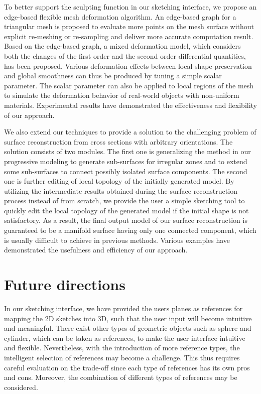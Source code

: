 To better support the sculpting function  in our sketching
interface, we propose an edge-based flexible mesh deformation
algorithm. An edge-based graph for a triangular mesh is proposed to
evaluate more points on the mesh surface without explicit re-meshing
or re-sampling and deliver more accurate computation result. Based
on the edge-based graph, a mixed deformation model, which considers
both the changes of the first order and the second order
differential quantities, has been proposed. Various deformation
effects between local shape preservation and global smoothness can
thus be produced by tuning a simple scalar parameter. The scalar
parameter can also be applied to local regions of the mesh to
simulate the deformation behavior of real-world objects with
non-uniform materials. Experimental results have demonstrated the
effectiveness and flexibility of our approach.

We also extend our techniques to provide a solution to the
challenging problem of surface reconstruction from cross sections
with arbitrary orientations. The solution consists of two modules.
The first one is generalizing the method in our progressive modeling
to generate sub-surfaces for irregular zones and to extend some
sub-surfaces to connect possibly isolated surface components. The
second one is further editing of local topology of the initially
generated model. By utilizing the intermediate results obtained
during the surface reconstruction process instead of from scratch,
we provide the user a simple sketching tool to quickly edit the
local topology of the generated model if the initial shape is not
satisfactory. As a result, the final output model of our surface
reconstruction is guaranteed to be a manifold surface having only
one connected component, which is usually difficult to achieve in
previous methods. Various examples have demonstrated the usefulness
and efficiency of our approach.


\section{Future directions}
\label{chap:conclusion_sec:2}
In our sketching interface, we have provided  the users planes as
references for mapping the 2D sketches into 3D, such that the user
input will become intuitive and meaningful. There exist other types
of geometric objects such as sphere and cylinder, which can be taken
as references, to make the user interface intuitive and flexible.
Nevertheless, with the introduction of more reference types, the
intelligent selection of references may become a challenge. This
thus requires careful evaluation on the trade-off since each type of
references has its own pros and cons. Moreover, the combination of
different types of references may be considered.

